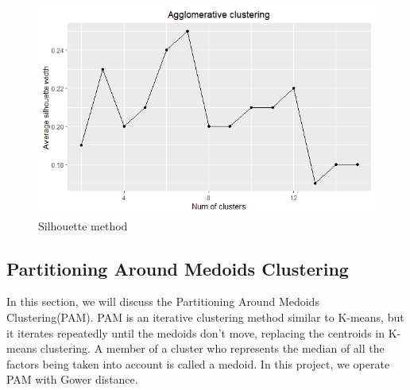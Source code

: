 \begin{figure}[!htb]
   \begin{minipage}{0.8\textwidth}
     \centering
     \includegraphics[width=1\linewidth]{image/shi_agg_w.png}
   \end{minipage}
   \caption{Silhouette method}\label{sil}
\end{figure}



\subsection{Partitioning Around Medoids Clustering}

In this section, we will discuss the Partitioning Around Medoids Clustering(PAM). PAM is an iterative clustering method similar to K-means, but it iterates repeatedly until the medoids don't move, replacing the centroids in K-means clustering. A member of a cluster who represents the median of all the factors being taken into account is called a medoid. In this project, we operate PAM with Gower distance.

